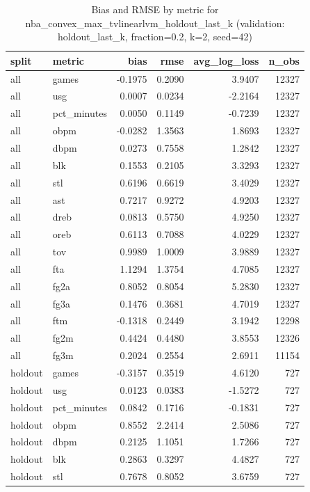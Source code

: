 \begin{table}
\caption{Bias and RMSE by metric for nba_convex_max_tvlinearlvm_holdout_last_k (validation: holdout_last_k, fraction=0.2, k=2, seed=42)}
\label{tab:nba_convex_max_tvlinearlvm_holdout_last_k_vs_holdout_last_k_f20_k2_s42_bias_rmse}
\begin{tabular}{llrrrr}
\toprule
split & metric & bias & rmse & avg\_log\_loss & n\_obs \\
\midrule
all & games & -0.1975 & 0.2090 & 3.9407 & 12327 \\
all & usg & 0.0007 & 0.0234 & -2.2164 & 12327 \\
all & pct\_minutes & 0.0050 & 0.1149 & -0.7239 & 12327 \\
all & obpm & -0.0282 & 1.3563 & 1.8693 & 12327 \\
all & dbpm & 0.0273 & 0.7558 & 1.2842 & 12327 \\
all & blk & 0.1553 & 0.2105 & 3.3293 & 12327 \\
all & stl & 0.6196 & 0.6619 & 3.4029 & 12327 \\
all & ast & 0.7217 & 0.9272 & 4.9203 & 12327 \\
all & dreb & 0.0813 & 0.5750 & 4.9250 & 12327 \\
all & oreb & 0.6113 & 0.7088 & 4.0229 & 12327 \\
all & tov & 0.9989 & 1.0009 & 3.9889 & 12327 \\
all & fta & 1.1294 & 1.3754 & 4.7085 & 12327 \\
all & fg2a & 0.8052 & 0.8054 & 5.2830 & 12327 \\
all & fg3a & 0.1476 & 0.3681 & 4.7019 & 12327 \\
all & ftm & -0.1318 & 0.2449 & 3.1942 & 12298 \\
all & fg2m & 0.4424 & 0.4480 & 3.8553 & 12326 \\
all & fg3m & 0.2024 & 0.2554 & 2.6911 & 11154 \\
holdout & games & -0.3157 & 0.3519 & 4.6120 & 727 \\
holdout & usg & 0.0123 & 0.0383 & -1.5272 & 727 \\
holdout & pct\_minutes & 0.0842 & 0.1716 & -0.1831 & 727 \\
holdout & obpm & 0.8552 & 2.2414 & 2.5086 & 727 \\
holdout & dbpm & 0.2125 & 1.1051 & 1.7266 & 727 \\
holdout & blk & 0.2863 & 0.3297 & 4.4827 & 727 \\
holdout & stl & 0.7678 & 0.8052 & 3.6759 & 727 \\

\end{tabular}
\end{table}
